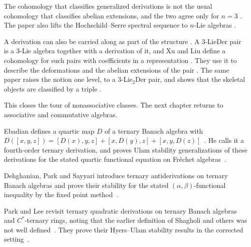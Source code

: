 The cohomology that classifies generalized derivations is not the usual
cohomology that classifies abelian extensions, and the two agree only for
$n=3$ \cite[p.~2]{AtesliEsenSutlu2021}. The paper also lifts the
Hochschild--Serre spectral sequence to $n$-Lie algebras
\cite[pp.~2--3]{AtesliEsenSutlu2021}.

A derivation can also be carried along as part of the structure
\cite[p.~1]{XuLiu2021ThreeLieDer}. A 3-LieDer pair is a 3-Lie algebra together
with a derivation of it, and Xu and Liu define a cohomology for such pairs
with coefficients in a representation \cite[p.~1]{XuLiu2021ThreeLieDer}. They
use it to describe the deformations and the abelian extensions of the pair
\cite[p.~1]{XuLiu2021ThreeLieDer}. The same paper raises the notion one level,
to a 3-Lie$_2$Der pair, and shows that the skeletal objects are classified by
a triple \cite[p.~1]{XuLiu2021ThreeLieDer}.

This closes the tour of nonassociative classes. The next chapter returns to
associative and commutative algebras.

Ebadian defines a quartic map $D$ of a ternary Banach algebra with
$D([x,y,z])=[D(x),y,z]+[x,D(y),z]+[x,y,D(z)]$~\cite{WlUlamStabilityGeneralizationsOf2013}. He calls it a fourth-order
ternary
derivation, and proves Ulam stability generalizations of these derivations for
the stated quartic functional equation on Fr\'echet
algebras~\cite{WlUlamStabilityGeneralizationsOf2013}.

Dehghanian, Park and Sayyari introduce ternary antiderivations on ternary
Banach algebras and prove their stability for the stated
$(\alpha,\beta)$-functional inequality by the fixed point
method~\cite{WlStabilityOfTernaryAntiderivati2023}.

Park and Lee revisit ternary quadratic derivations on ternary Banach algebras
and $C^*$-ternary rings, noting that the earlier definition of Shagholi and
others was not well defined~\cite{WlApproximateTernaryQuadraticDer2015}. They prove their Hyers--Ulam stability results in
the corrected setting~\cite{WlApproximateTernaryQuadraticDer2015}.
